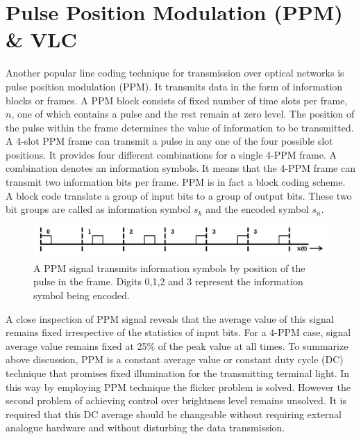 \section{Pulse Position Modulation (PPM) \& VLC}
Another popular line coding technique for transmission over optical networks is pulse position modulation (PPM). It transmits data in the form of information blocks or frames. A PPM block consists of fixed number of time slots per frame, $n$, one of which contains a pulse and the rest remain at zero level. The position of the pulse within the frame determines the value of information to be transmitted. A 4-slot PPM frame can transmit a pulse in any one of the four possible slot positions. It provides four different combinations for a single 4-PPM frame. A combination denotes an information symbols. It means that the 4-PPM frame can transmit two information bits per frame. PPM is in fact a block coding scheme. A block code translate a group of input bits to a group of output bits. These two bit groups are called as information symbol $s_k$ and the encoded symbol $s_n$.

\begin{figure}[t]
\centering
\includegraphics[width = \figwidth]{../Figures/PPM_frame}
\caption[PPM Signal]{A PPM signal transmits information symbols by position of the pulse in the frame. Digits 0,1,2 and 3 represent the information symbol being encoded.}
\label{fig:PPM_frame}
\end{figure}




A close inspection of PPM signal reveals that the average value of this signal remains fixed irrespective of the statistics of input bits. For a 4-PPM case, signal average value remains fixed at 25\% of the peak value at all times. To summarize above discussion, PPM is a constant average value or constant duty cycle (DC) technique that promises fixed illumination for the transmitting terminal light. In this way by employing PPM technique the flicker problem is solved. However the second problem of achieving control over brightness level remains unsolved. It is required that this DC average should be changeable without requiring external analogue hardware and without disturbing the data transmission.



